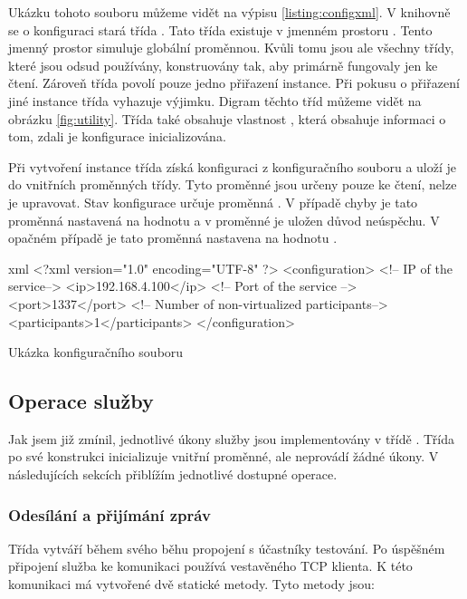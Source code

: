 Ukázku tohoto souboru můžeme vidět na výpisu \ref{listing:configxml}. V knihovně se o konfiguraci stará třída . Tato třída existuje v jmenném prostoru . Tento jmenný prostor simuluje globální proměnnou. Kvůli tomu jsou ale všechny třídy, které jsou odsud používány, konstruovány tak, aby primárně fungovaly jen ke čtení. Zároveň třída  povolí pouze jedno přiřazení instance. Při pokusu o přiřazení jiné instance třída vyhazuje výjimku. Digram těchto tříd můžeme vidět na obrázku \ref{fig:utility}. Třída také obsahuje vlastnost , která obsahuje informaci o tom, zdali je konfigurace inicializována.

Při vytvoření instance třída získá konfiguraci z konfiguračního souboru a uloží je do vnitřních proměnných třídy. Tyto proměnné jsou určeny pouze ke čtení, nelze je upravovat. Stav konfigurace určuje proměnná . V případě chyby je tato proměnná nastavená na hodnotu  a v proměnné  je uložen důvod neúspěchu. V opačném případě je tato proměnná nastavena na hodnotu .

\begin{listing}[htbp]
    \centering
    \begin{cminted}{xml}
<?xml version="1.0" encoding="UTF-8" ?>
<configuration>
  <!-- IP of the service-->
  <ip>192.168.4.100</ip>
  <!-- Port of the service -->
  <port>1337</port>
  <!-- Number of non-virtualized participants-->
  <participants>1</participants>
</configuration>
    \end{cminted}
    \caption{Ukázka konfiguračního souboru}
    \label{listing:configxml}
\end{listing}


\subsection{Operace služby}

Jak jsem již zmínil, jednotlivé úkony služby jsou implementovány v třídě . 
Třída po své konstrukci inicializuje vnitřní proměnné, ale neprovádí žádné úkony. V následujících sekcích přiblížím jednotlivé dostupné operace.

\subsubsection{Odesílání a přijímání zpráv}
Třída  vytváří během svého běhu propojení s účastníky testování. Po úspěšném připojení služba ke komunikaci používá vestavěného TCP klienta. K této komunikaci má vytvořené dvě statické metody. Tyto metody jsou:

